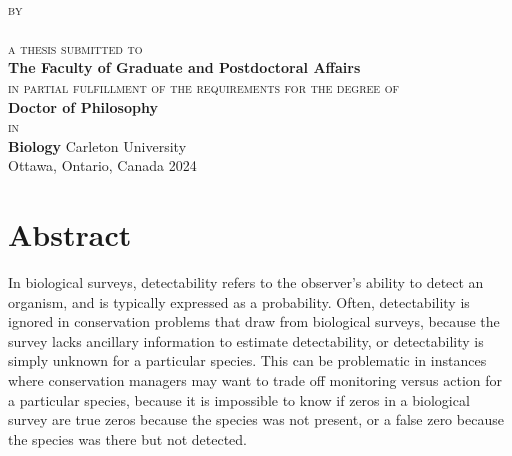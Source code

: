 \begin{titlepage}
  \thispagestyle{empty}
  \centering
  \vspace*{\fill}
  {\LARGE \textbf{\expandafter{\thesistitleI}}}\\[2mm]
  \vfill
  {\scshape by}\\
  {\large \expandafter{\myname}}\\
  \vfill
  {\scshape a thesis submitted to}\\
  \textbf{The Faculty of Graduate and Postdoctoral Affairs}\\
  {\scshape in partial fulfillment of the requirements for the degree of}\\
  \textbf{Doctor of Philosophy}\\
  {\scshape in}\\
  \textbf{Biology}
  \vfill
  {\large Carleton University}\\
  {\large Ottawa, Ontario, Canada}
  \vfill
  {\large \textcopyright{} 2024}\\
  {\large \expandafter{\myname}}
\end{titlepage}

\clearpage

\setcounter{page}{2}

\chapter*{Abstract}


\par In biological surveys, detectability refers to the observer's ability to detect an organism, and is typically expressed as a probability. Often, detectability is ignored in conservation problems that draw from biological surveys, because the survey lacks ancillary information to estimate detectability, or detectability is simply unknown for a particular species. This can be problematic in instances where conservation managers may want to trade off monitoring versus action for a particular species, because it is impossible to know if zeros in a biological survey are true zeros because the species was not present, or a false zero because the species was there but not detected. 

